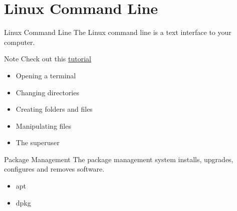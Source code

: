 \documentclass[12pt,letterpaper]{beamer}
\begin{document}
\section{Linux Command Line}
\begin{frame}{Linux Command Line}
    The Linux command line is a text interface to your computer. 
    \begin{block}{Note}
        Check out this \href{https://ubuntu.com/tutorials/command-line-for-beginners}{tutorial}
    \end{block}
    
    \begin{itemize}
        \item Opening a terminal
        \item Changing directories
        \item Creating folders and files
        \item Manipulating files
        \item The superuser
    \end{itemize}

\end{frame}

\begin{frame}{Package Management}
    The package management system installs, upgrades, configures and removes software. 
    \begin{itemize}
        \item apt
        \item dpkg
    \end{itemize}

\end{frame}
\end{document}
